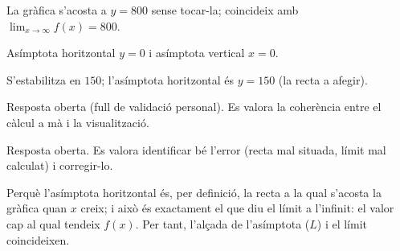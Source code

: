 \begin{solucions}
\begin{sollist}
  \item La gràfica s'acosta a $y=800$ sense tocar-la; coincideix amb
        $\lim_{x\to\infty}f(x)=800$.
  \item Asímptota horitzontal $y=0$ i asímptota vertical $x=0$.
  \item S'estabilitza en $150$; l'asímptota horitzontal és $y=150$ (la recta a afegir).
  \item Resposta oberta (full de validació personal). Es valora la coherència entre el
        càlcul a mà i la visualització.
  \item Resposta oberta. Es valora identificar bé l'error (recta mal situada, límit mal
        calculat) i corregir-lo.
  \item Perquè l'asímptota horitzontal és, per definició, la recta a la qual s'acosta la
        gràfica quan $x$ creix; i això és exactament el que diu el límit a l'infinit: el
        valor cap al qual tendeix $f(x)$. Per tant, l'alçada de l'asímptota ($L$) i el
        límit coincideixen.
\end{sollist}
\end{solucions}
